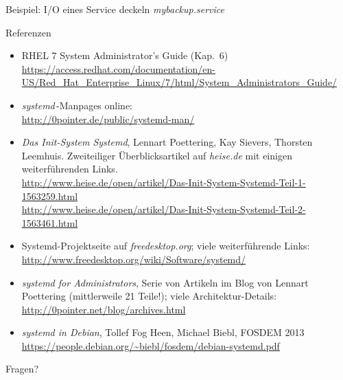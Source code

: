 \begin{frame}{Beispiel: I/O eines Service deckeln}
\emph{mybackup.service}
\footnotesize

\end{frame}

\begin{frame}[allowframebreaks]{Referenzen}
  \footnotesize
  \begin{itemize}
    \item RHEL 7 System Administrator's Guide
    (Kap.~6)\\ \url{https://access.redhat.com/documentation/en-US/Red_Hat_Enterprise_Linux/7/html/System_Administrators_Guide/}

    \item \emph{systemd}\,-Manpages online:\\
    \url{http://0pointer.de/public/systemd-man/}

    \item \emph{Das Init-System Systemd}, Lennart Poettering, Kay
    Sievers, Thorsten Leemhuis.  Zweiteiliger Überblicksartikel auf
    \emph{heise.de} mit einigen weiterführenden Links.\\
    \url{http://www.heise.de/open/artikel/Das-Init-System-Systemd-Teil-1-1563259.html}\\
    \url{http://www.heise.de/open/artikel/Das-Init-System-Systemd-Teil-2-1563461.html}

    \item Systemd-Projektseite auf \emph{freedesktop.org}; viele
    weiterführende Links:\\
    \url{http://www.freedesktop.org/wiki/Software/systemd/}

    \framebreak
    
    \item \emph{systemd for Administrators}, Serie von Artikeln im Blog
    von Lennart Poettering (mittlerweile 21 Teile!); viele
    Architektur-Details:\\
    \url{http://0pointer.net/blog/archives.html}

    \item \emph{systemd in Debian}, Tollef Fog Heen, Michael Biebl,
    FOSDEM 2013\\
    \url{https://people.debian.org/~biebl/fosdem/debian-systemd.pdf}
    
  \end{itemize}
\end{frame}


\begin{frame}[plain]
  \centerline{\Huge Fragen?}
\end{frame}



